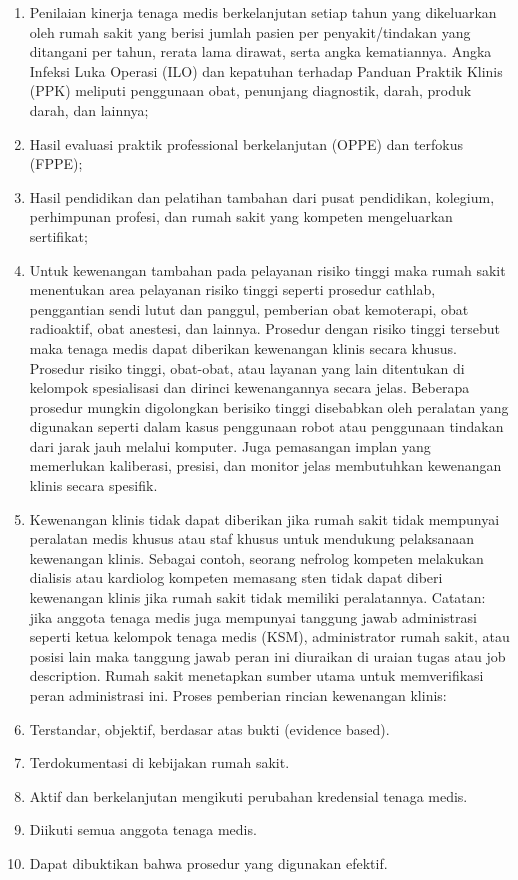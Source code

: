 \documentclass[
]{book}
\begin{document}
\begin{enumerate}
\def\labelenumi{\alph{enumi}.}
\setcounter{enumi}{5}
\item
  Penilaian kinerja tenaga medis berkelanjutan setiap tahun yang dikeluarkan oleh rumah sakit yang berisi jumlah pasien per penyakit/tindakan yang ditangani per tahun, rerata lama dirawat, serta angka kematiannya. Angka Infeksi Luka Operasi (ILO) dan kepatuhan terhadap Panduan Praktik Klinis (PPK) meliputi penggunaan obat, penunjang diagnostik, darah, produk darah, dan lainnya;
\item
  Hasil evaluasi praktik professional berkelanjutan (OPPE) dan terfokus (FPPE);
\item
  Hasil pendidikan dan pelatihan tambahan dari pusat pendidikan, kolegium, perhimpunan profesi, dan rumah sakit yang kompeten mengeluarkan sertifikat;
\item
  Untuk kewenangan tambahan pada pelayanan risiko tinggi maka rumah sakit menentukan area pelayanan risiko tinggi seperti prosedur cathlab, penggantian sendi lutut dan panggul, pemberian obat kemoterapi, obat radioaktif, obat anestesi, dan lainnya. Prosedur dengan risiko tinggi tersebut maka tenaga medis dapat diberikan kewenangan klinis secara khusus. Prosedur risiko tinggi, obat-obat, atau layanan yang lain ditentukan di kelompok spesialisasi dan dirinci kewenangannya secara jelas. Beberapa prosedur mungkin digolongkan berisiko tinggi disebabkan oleh peralatan yang digunakan seperti dalam kasus penggunaan robot atau penggunaan tindakan dari jarak jauh melalui komputer. Juga pemasangan implan yang memerlukan kaliberasi, presisi, dan monitor jelas membutuhkan kewenangan klinis secara spesifik.
\item
  Kewenangan klinis tidak dapat diberikan jika rumah sakit tidak mempunyai peralatan medis khusus atau staf khusus untuk mendukung pelaksanaan kewenangan klinis. Sebagai contoh, seorang nefrolog kompeten melakukan dialisis atau kardiolog kompeten memasang sten tidak dapat diberi kewenangan klinis jika rumah sakit tidak memiliki peralatannya.
  Catatan: jika anggota tenaga medis juga mempunyai tanggung jawab administrasi seperti ketua kelompok tenaga medis (KSM), administrator rumah sakit, atau posisi lain maka tanggung jawab peran ini diuraikan di uraian tugas atau job description. Rumah sakit menetapkan sumber utama untuk memverifikasi peran administrasi ini.
  Proses pemberian rincian kewenangan klinis:
\item
  Terstandar, objektif, berdasar atas bukti (evidence based).
\item
  Terdokumentasi di kebijakan rumah sakit.
\item
  Aktif dan berkelanjutan mengikuti perubahan kredensial tenaga medis.
\item
  Diikuti semua anggota tenaga medis.
\item
  Dapat dibuktikan bahwa prosedur yang digunakan efektif.
\end{enumerate}
\end{document}

